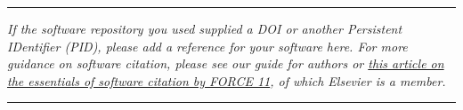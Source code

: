 \documentclass[numbers, preprint, twocolumn,10pt]{elsarticle}
\newenvironment{instructions}
  {\hrule\vspace{4pt}\begingroup\color{red}\itshape}
  {\endgroup\hrule\vspace{4pt}}
\begin{document}






\begin{instructions}
\textit{
    If the software repository you used supplied a DOI or another
    Persistent IDentifier (PID), please add a reference for your software
    here. For more guidance on software citation, please see our guide for
    authors or \href{https://f1000research.com/articles/9-1257/v2}{this
      article on the essentials of software citation by FORCE 11}, of
    which Elsevier is a member.
}
\end{instructions}
\end{document}
